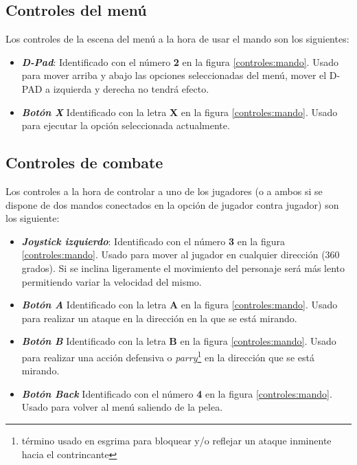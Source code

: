 \subsection{Controles del menú}

Los controles de la escena del menú a la hora de usar el mando son los siguientes:

\begin{itemize}
	\item \textbf{\textit{D-Pad}}: Identificado con el número \textbf{2} en la figura \ref{controles:mando}. Usado para mover arriba y abajo las opciones seleccionadas del menú, mover el D-PAD a izquierda y derecha no tendrá efecto.
	\item \textbf{\textit{Botón X}} Identificado con la letra \textbf{X} en la figura \ref{controles:mando}. Usado para ejecutar la opción seleccionada actualmente.
\end{itemize}

\subsection{Controles de combate}

Los controles a la hora de controlar a uno de los jugadores (o a ambos si se dispone de dos mandos conectados en la opción de jugador contra jugador) son los siguiente:

\begin{itemize}
	\item \textbf{\textit{Joystick izquierdo}}: Identificado con el número \textbf{3} en la figura \ref{controles:mando}. Usado para mover al jugador en cualquier dirección (360 grados). Si se inclina ligeramente el movimiento del personaje será más lento permitiendo variar la velocidad del mismo.
	\item \textbf{\textit{Botón A}} Identificado con la letra \textbf{A} en la figura \ref{controles:mando}. Usado para realizar un ataque en la dirección en la que se está mirando.
	\item \textbf{\textit{Botón B}} Identificado con la letra \textbf{B} en la figura \ref{controles:mando}. Usado para realizar una acción defensiva o \textit{parry}\footnote{término usado en esgrima para bloquear y/o reflejar un ataque inminente hacia el contrincante} en la dirección que se está mirando.
	\item \textbf{\textit{Botón Back}} Identificado con el número \textbf{4} en la figura \ref{controles:mando}. Usado para volver al menú saliendo de la pelea.
\end{itemize}

